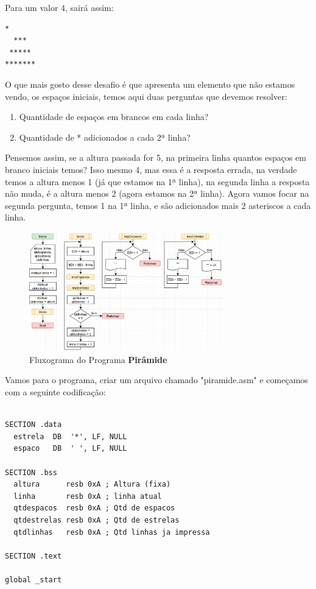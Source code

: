Para um valor 4, sairá assim:
\begin{lstlisting}[]
   *
  ***
 *****
*******
\end{lstlisting}

O que mais gosto desse desafio é que apresenta um elemento que não estamos vendo, os espaços iniciais, temos aqui duas perguntas que devemos resolver:
\begin{enumerate}[nolistsep]
	\item Quantidade de espaços em brancos em cada linha?
	\item Quantidade de * adicionados a cada 2ª linha?
\end{enumerate}

Pensemos assim, se a altura passada for 5, na primeira linha quantos espaços em branco iniciais temos? Isso mesmo 4, mas essa é a resposta errada, na verdade temos a altura menos 1 (já que estamos na 1ª linha), na segunda linha a resposta não muda, é a altura menos 2 (agora estamos na 2ª linha). Agora vamos focar na segunda pergunta, temos 1 na 1ª linha, e são adicionados mais 2 asteriscos a cada linha.

\begin{figure}[H]
	\centering
	\includegraphics[width=0.75\textwidth]{Pictures/cap03/programa11}
	\caption{Fluxograma do Programa \textbf{Pirâmide}}
\end{figure}

Vamos para o programa, criar um arquivo chamado "piramide.asm" e começamos com a seguinte codificação:
\begin{lstlisting}[]
%include 'bibliotecaE.inc'

SECTION .data
  estrela  DB  '*', LF, NULL
  espaco   DB  ' ', LF, NULL

SECTION .bss
  altura      resb 0xA ; Altura (fixa)
  linha       resb 0xA ; linha atual
  qtdespacos  resb 0xA ; Qtd de espacos
  qtdestrelas resb 0xA ; Qtd de estrelas
  qtdlinhas   resb 0xA ; Qtd linhas ja impressa

SECTION .text

global _start
\end{lstlisting}

